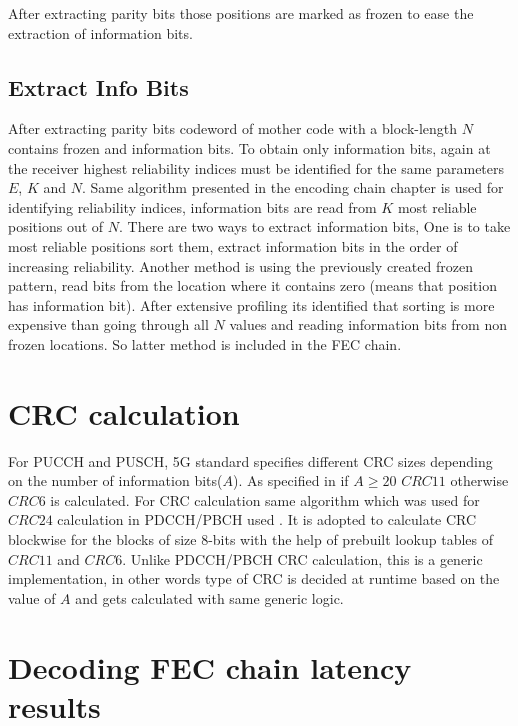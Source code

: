 After extracting parity bits those positions are marked as frozen to ease the extraction of information bits.

\subsection{Extract Info Bits}
After extracting parity bits codeword of mother code with a block-length $N$ contains frozen and information bits. To obtain only information bits, again at the receiver highest reliability indices must be identified for the same parameters $E$, $K$ and $N$. Same algorithm presented in the encoding chain chapter is used for identifying reliability indices, information bits are read from $K$ most reliable positions out of $N$. There are two ways to extract information bits, One is to take most reliable positions sort them, extract information bits in the order of increasing reliability. Another method is using the previously created frozen pattern, read bits from the location where it contains zero (means that position has information bit). After extensive profiling its identified that sorting is more expensive than going through all $N$ values and reading information bits from non frozen locations. So latter method is included in the FEC chain.

\section{CRC calculation}
For PUCCH and PUSCH, 5G standard specifies different CRC sizes depending on the number of information bits($A$). As specified in \cite{3gpp.38.212} if $ A \ge 20$ $ CRC11 $  otherwise $ CRC6 $ is calculated.  For CRC calculation same algorithm which was used for $ CRC24 $ calculation in PDCCH/PBCH used \cite{Sarwate:1988:CCR:63030.63037}. It is adopted to calculate CRC blockwise for the blocks of size 8-bits with the help of prebuilt lookup tables of $ CRC11 $ and $ CRC6 $. Unlike PDCCH/PBCH CRC calculation, this is a generic implementation, in other words type of CRC is decided at runtime based on the value of $A$ and gets calculated with same generic logic.

\section{Decoding FEC chain latency results}


